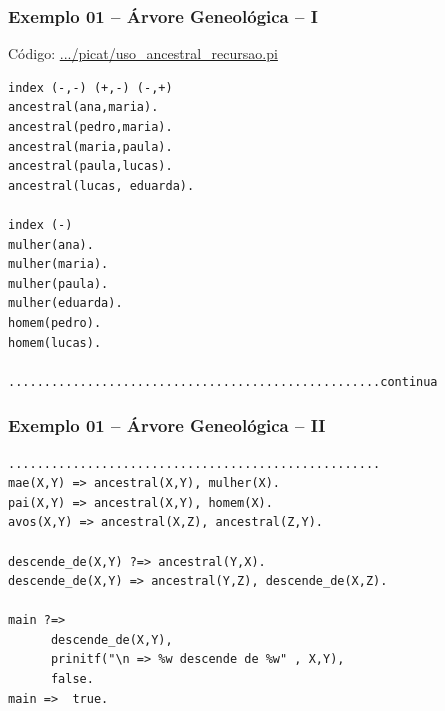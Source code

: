 
\begin{frame}[fragile]

\frametitle{Exemplo 01 -- Árvore Geneológica -- I}
 
Código:  \url{.../picat/uso_ancestral_recursao.pi}
\begin{lstlisting}[frame=single]
index (-,-) (+,-) (-,+)
ancestral(ana,maria).
ancestral(pedro,maria).
ancestral(maria,paula).
ancestral(paula,lucas).
ancestral(lucas, eduarda).

index (-)
mulher(ana).
mulher(maria).
mulher(paula).
mulher(eduarda).
homem(pedro).
homem(lucas).

....................................................continua
\end{lstlisting}
    
\end{frame}
\begin{frame}[fragile]

\frametitle{Exemplo 01 -- Árvore Geneológica -- II}
 
\begin{lstlisting}[frame=single]
....................................................
mae(X,Y) => ancestral(X,Y), mulher(X).
pai(X,Y) => ancestral(X,Y), homem(X).
avos(X,Y) => ancestral(X,Z), ancestral(Z,Y).

descende_de(X,Y) ?=> ancestral(Y,X).
descende_de(X,Y) => ancestral(Y,Z), descende_de(X,Z).

main ?=>
      descende_de(X,Y),
      prinitf("\n => %w descende de %w" , X,Y),
      false. 
main =>  true.
\end{lstlisting}
    
\end{frame}



